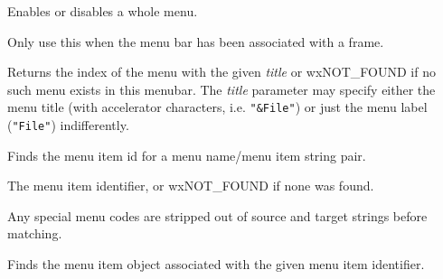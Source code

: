 Enables or disables a whole menu.





Only use this when the menu bar has been
associated with a frame.

\label{wxmenubarfindmenu}


Returns the index of the menu with the given {\it title} or wxNOT\_FOUND if no
such menu exists in this menubar. The {\it title} parameter may specify either
the menu title (with accelerator characters, i.e. {\tt "\&File"}) or just the
menu label ({\tt "File"}) indifferently.

\label{wxmenubarfindmenuitem}


Finds the menu item id for a menu name/menu item string pair.





The menu item identifier, or wxNOT\_FOUND if none was found.


Any special menu codes are stripped out of source and target strings
before matching.

\label{wxmenubarfinditem}


Finds the menu item object associated with the given menu item identifier.





